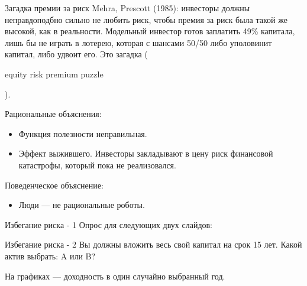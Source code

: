\documentclass{beamer}
\newcommand{\qrcodeminipage}[1]{
	\begin{minipage}{0.3\textwidth}
		\qrcode[height=\textwidth]{#1}
	\end{minipage}
}
\newcommand{\en}[1]{\begin{otherlanguage}{english}#1\end{otherlanguage}}
\begin{document}
\begin{frame}{Загадка премии за риск}
\justify
Mehra, Prescott (1985): инвесторы должны неправдоподбно сильно не любить риск,
чтобы премия за риск была такой же высокой, как в реальности. Модельный 
инвестор готов заплатить 49\% капитала, лишь бы не играть в лотерею, которая с 
шансами 50/50 либо уполовинит капитал, либо удвоит его. Это загадка (\en{equity 
risk premium puzzle}).

\justify
Рациональные объяснения:
\begin{itemize}
\justifying
\item Функция полезности неправильная.
\item Эффект выжившего. Инвесторы закладывают в цену риск финансовой
катастрофы, который пока не реализовался.
\end{itemize}

\justify
Поведенческое объяснение:
\begin{itemize}
\item Люди --- не рациональные роботы.
\end{itemize}
\end{frame}



\begin{frame}{Избегание риска - 1}
\justify
Опрос для следующих двух слайдов:

\justify
\centering
\qrcodeminipage{https://www.menti.com/mjujee2hfe}
\end{frame}



\begin{frame}{Избегание риска - 2}
\justify
Вы должны вложить весь свой капитал на срок 15 лет. Какой актив выбрать: A или
B?

\justify
\centering
{}

\justify
На графиках --- доходность в один случайно выбранный год.
\end{frame}
\end{document}
